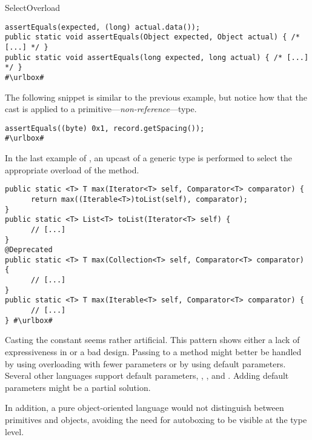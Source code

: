 \begin{pattern}{SelectOverload}
\def\urlvar{http://bit.ly/spullara_redis_protocol_2FC9Llb}
\begin{verbatim}
assertEquals(expected, (long) actual.data());
public static void assertEquals(Object expected, Object actual) { /* [...] */ }
public static void assertEquals(long expected, long actual) { /* [...] */ }
#\urlbox#
\end{verbatim}

The following snippet is similar to the previous example,
but notice how that the cast is applied to a
primitive---\emph{non-reference}---type.

\def\urlvar{http://bit.ly/apache_poi_2StrlOn}
\begin{verbatim}
assertEquals((byte) 0x1, record.getSpacing());
#\urlbox#
\end{verbatim}

In the last example of \thisp,
an upcast of a generic type is performed to select the appropriate overload of the  method.

\def\urlvar{http://bit.ly/groovy_groovy_core_2HDAkbF}
\begin{verbatim}
public static <T> T max(Iterator<T> self, Comparator<T> comparator) {
      return max((Iterable<T>)toList(self), comparator);
}
public static <T> List<T> toList(Iterator<T> self) {
      // [...]
}
@Deprecated
public static <T> T max(Collection<T> self, Comparator<T> comparator) {
      // [...]
}
public static <T> T max(Iterable<T> self, Comparator<T> comparator) {
      // [...]
} #\urlbox#
\end{verbatim}

\issues{}
Casting the  constant seems rather artificial.
This pattern shows either a lack of expressiveness in \java{} or a bad \api{} design.
Passing  to a method might better be handled by using overloading with fewer parameters or by using default parameters.
Several other languages support default parameters,
\eg, \scala{}, \csharp{} and \cpp{}.
Adding default parameters might be a partial solution.

In addition, a pure object-oriented language would not distinguish between primitives and objects,
avoiding the need for autoboxing to be visible at the type level.


\end{pattern}